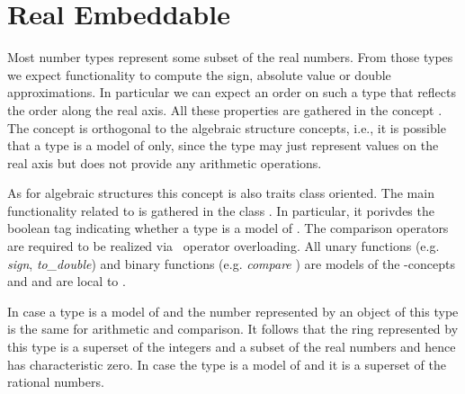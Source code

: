 \section{Real Embeddable}

Most number types represent some subset of the real numbers. From those types 
we expect functionality to compute the sign, absolute value or double 
approximations. In particular we can expect an order on such a type that 
reflects the order along the real axis. 
All these properties are gathered in the concept . 
The concept is orthogonal to the algebraic structure concepts, 
i.e., it is possible 
that a type is a model of  only, 
since the type may just represent values on the real axis
but does not provide any arithmetic operations.


As for algebraic structures this concept is also traits class oriented.
The main functionality related to  is gathered in 
the class . In particular, it porivdes the boolean 
tag   indicating whether a type is a model of 
. The comparison operators are required to be realized via 
\CC\ operator overloading. 
All unary functions (e.g. {\em sign}, {\em to\_double}) and 
binary functions (e.g. {\em compare} ) are models of the \stl-concepts 
 and  and are local 
to . 


In case a type is a model of  and  
 the number represented by an object of this type is 
the same for arithmetic and comparison.
It follows that the ring represented  by this type is a superset of the integers
and a subset of the real numbers and hence has characteristic zero.
In case the type is a model of  and  it is a 
superset of the rational numbers. 


